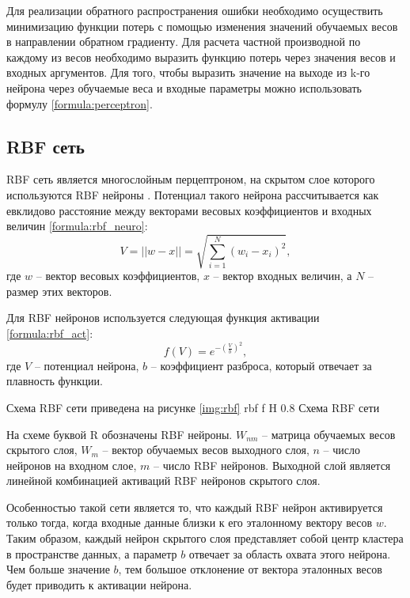Для реализации обратного распространения ошибки необходимо осуществить минимизацию функции потерь с помощью изменения значений обучаемых весов в направлении обратном градиенту.
Для расчета частной производной по каждому из весов необходимо выразить функцию потерь через значения весов и входных аргументов.
Для того, чтобы выразить значение на выходе из k-го нейрона через обучаемые веса и входные параметры можно использовать формулу \ref{formula:perceptron}.

\subsection{RBF сеть}
RBF сеть является многослойным перцептроном, на скрытом слое которого используются RBF нейроны \cite{jiang2022efficient}.
Потенциал такого нейрона рассчитывается как евклидово расстояние между векторами весовых коэффициентов и входных величин \ref{formula:rbf_neuro}:
\begin{equation}\label{formula:rbf_neuro}
	V = ||w - x|| = \sqrt{\sum_{i=1}^{N}(w_i-x_i)^2},
\end{equation}
где $w$ -- вектор весовых коэффициентов, $x$ -- вектор входных величин, а $N$ -- размер этих векторов.

Для RBF нейронов используется следующая функция активации \ref{formula:rbf_act}:
\begin{equation}\label{formula:rbf_act}
	f(V) = e^{-(\frac{V}{b})^2},
\end{equation}
где $V$ -- потенциал нейрона, $b$ -- коэффициент разброса, который отвечает за плавность функции.

Схема RBF сети приведена на рисунке \ref{img:rbf}
{rbf} %
{f} %
{H} %
{0.8\textwidth} %
{Схема RBF сети} %

На схеме буквой R обозначены RBF нейроны. $W_{nm}$ -- матрица обучаемых весов скрытого слоя, $W_m$ -- вектор обучаемых весов выходного слоя, $n$ -- число нейронов на входном слое, $m$ -- число RBF нейронов.
Выходной слой является линейной комбинацией активаций RBF нейронов скрытого слоя.

Особенностью такой сети является то, что каждый RBF нейрон активируется только тогда, когда входные данные близки к его эталонному вектору весов $w$.
Таким образом, каждый нейрон скрытого слоя представляет собой центр кластера в пространстве данных, а параметр $b$ отвечает за область охвата этого нейрона.
Чем больше значение $b$, тем большое отклонение от вектора эталонных весов будет приводить к активации нейрона.

